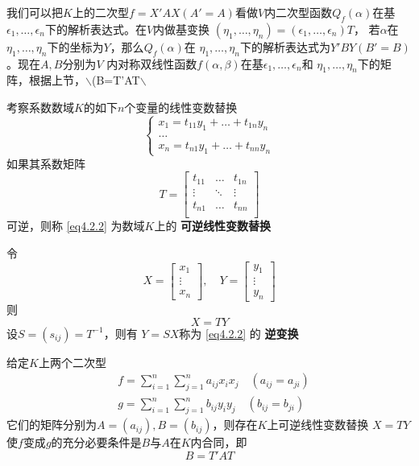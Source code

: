 \documentclass[11pt]{article}
\begin{document}
我们可以把\(K\)上的二次型\(f=X'AX(A'=A)\)看做\(V\)内二次型函数\(Q_f(\alpha)\)在基
\(\epsilon_1,\dots,\epsilon_n\)下的解析表达式。在\(V\)内做基变换
\((\eta_1,\dots,\eta_n)=(\epsilon_1,\dots,\epsilon_n)T\)， 若\(\alpha\)在
\(\eta_1,\dots,\eta_n\)下的坐标为\(Y\)，那么\(Q_f(\alpha)\)在
\(\eta_1,\dots,\eta_n\)下的解析表达式为\(Y'BY(B'=B)\)。现在\(A,B\)分别为\(V\)
内对称双线性函数\(f(\alpha,\beta)\)在基\(\epsilon_1,\dots,\epsilon_n\)和
\(\eta_1,\dots,\eta_n\)下的矩阵，根据上节，$\backslash$(B=T'AT$\backslash$

\begin{definition}[]
考察系数数域\(K\)的如下\(n\)个变量的线性变数替换
\begin{equation}
\begin{cases}
x_1=t_{11}y_1+\dots+t_{1n}y_n\\
\dots\\
x_n=t_{n1}y_1+\dots+t_{nn}y_n
\end{cases}\label{eq4.2.2}
\end{equation}
如果其系数矩阵
\begin{equation*}
T=
\begin{bmatrix}
t_{11}&\dots&t_{1n}\\
\vdots&\ddots&\vdots\\
t_{n1}&\dots&t_{nn}\\
\end{bmatrix}
\end{equation*}
可逆，则称 \eqref{eq4.2.2} 为数域\(K\)上的 \textbf{可逆线性变数替换}
\end{definition}

令
\begin{equation*}
X=
\begin{bmatrix}
x_1\\\vdots\\x_n
\end{bmatrix},\quad
Y=
\begin{bmatrix}
y_1\\\vdots\\y_n
\end{bmatrix}
\end{equation*}
则
\begin{equation*}
X=TY
\end{equation*}
设\(S=(s_{ij})=T^{-1}\)，则有 \(Y=SX\)称为 \eqref{eq4.2.2} 的 \textbf{逆变换}

\begin{proposition}[]
\label{prop4.2.2}
给定\(K\)上两个二次型
\begin{align*}
&f=\sum_{i=1}^n\sum_{j=1}^na_{ij}x_ix_j\quad(a_{ij}=a_{ji})\\
&g=\sum_{i=1}^n\sum_{j=1}^nb_{ij}y_iy_j\quad(b_{ij}=b_{ji})
\end{align*}
它们的矩阵分别为\(A=(a_{ij}),B=(b_{ij})\)，则存在\(K\)上可逆线性变数替换
\(X=TY\)使\(f\)变成\(g\)的充分必要条件是\(B\)与\(A\)在\(K\)内合同，即
\begin{equation*}
B=T'AT
\end{equation*}
\end{proposition}
\end{document}
